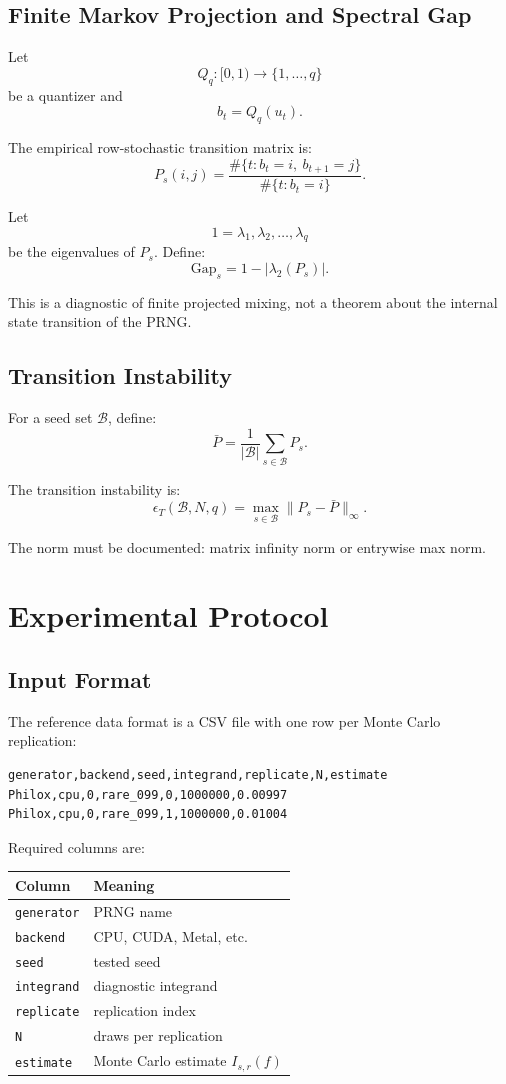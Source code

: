 \documentclass[11pt,a4paper]{article}
\begin{document}
\subsection{Finite Markov Projection and Spectral Gap}

Let
\[
Q_q:[0,1)\to\{1,\ldots,q\}
\]
be a quantizer and
\[
b_t=Q_q(u_t).
\]

The empirical row-stochastic transition matrix is:
\[
P_s(i,j)
=
\frac{
\#\{t:b_t=i,\ b_{t+1}=j\}
}{
\#\{t:b_t=i\}
}.
\]

Let
\[
1=\lambda_1,\lambda_2,\ldots,\lambda_q
\]
be the eigenvalues of \(P_s\). Define:
\[
\boxed{
\mathrm{Gap}_s
=
1-|\lambda_2(P_s)|.
}
\]

This is a diagnostic of finite projected mixing, not a theorem about the internal state transition of the PRNG.

\subsection{Transition Instability}

For a seed set \(\mathcal B\), define:
\[
\bar P
=
\frac1{|\mathcal B|}
\sum_{s\in\mathcal B}P_s.
\]

The transition instability is:
\[
\epsilon_T(\mathcal B,N,q)
=
\max_{s\in\mathcal B}
\|P_s-\bar P\|_\infty.
\]

The norm must be documented: matrix infinity norm or entrywise max norm.

\section{Experimental Protocol}

\subsection{Input Format}

The reference data format is a CSV file with one row per Monte Carlo replication:
\begin{verbatim}
generator,backend,seed,integrand,replicate,N,estimate
Philox,cpu,0,rare_099,0,1000000,0.00997
Philox,cpu,0,rare_099,1,1000000,0.01004
\end{verbatim}

Required columns are:
\begin{center}
\begin{tabular}{ll}
\toprule
Column & Meaning \\
\midrule
\texttt{generator} & PRNG name \\
\texttt{backend} & CPU, CUDA, Metal, etc. \\
\texttt{seed} & tested seed \\
\texttt{integrand} & diagnostic integrand \\
\texttt{replicate} & replication index \\
\texttt{N} & draws per replication \\
\texttt{estimate} & Monte Carlo estimate \(I_{s,r}(f)\) \\
\bottomrule
\end{tabular}
\end{center}
\end{document}
